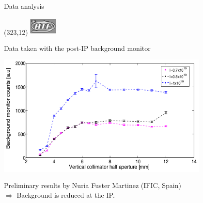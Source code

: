 \documentclass[xcolor={dvipsnames}]{beamer}
\newcommand{\ATFlogo}{
  \setlength{\TPHorizModule}{1pt}
  \setlength{\TPVertModule}{1pt}
  \begin{textblock}{1}(323,12)
   \includegraphics[width=40pt,height=26pt]{figures/ATF_logo.jpg}
  \end{textblock}
}
\begin{document}
\begin{frame}{Data analysis}
\ATFlogo
Data taken with the post-IP background monitor\\
\vspace*{0.3cm}
\begin{center}
  \includegraphics[width=0.8\textwidth]{figures/Nuria_postIP_Bkg_VerticalCollimator.png}\\
\end{center}
Preliminary results by Nuria Fuster Martinez (IFIC, Spain)\\
\Large{$\Rightarrow$ Background is reduced at the IP.}
\end{frame}
\end{document}
